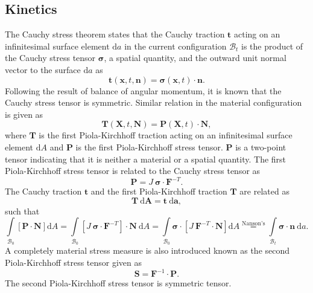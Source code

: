 \documentclass[11pt,a4paper,final]{article}
\begin{document}
\subsection{Kinetics}
The Cauchy stress theorem states that the Cauchy traction $\mathbf{t}$ acting on an infinitesimal surface element $\mathrm{d}a$ in the current configuration $\mathcal{B}_t$ is the product of the Cauchy stress tensor $\bm{\sigma}$, a spatial quantity, and the outward unit normal vector to the surface $\mathrm{d}a$ as 
\begin{equation}
\mathbf{t}(\mathbf{x}, t, \mathbf{n}) = \bm{\sigma}(\mathbf{x}, t) \cdot \mathbf{n}.
\end{equation}
Following the result of balance of angular momentum, it is known that the Cauchy stress tensor is symmetric. Similar relation in the material configuration is given as 
\begin{equation}
\mathbf{T}(\mathbf{X}, t, \mathbf{N}) = \mathbf{P}(\mathbf{X}, t) \cdot \mathbf{N},
\end{equation}
where $\mathbf{T}$ is the first Piola-Kirchhoff traction acting on an infinitesimal surface element $\mathrm{d}A$ and $\mathbf{P}$ is the first Piola-Kirchhoff stress tensor. $\mathbf{P}$ is a two-point tensor indicating that it is neither a material or a spatial quantity. The first Piola-Kirchhoff stress tensor is related to the Cauchy stress tensor as 
\begin{equation}
\mathbf{P} = J \ \bm{\sigma} \cdot \mathbf{F}^{-T}.
\end{equation}
The Cauchy traction $\mathbf{t}$ and the first Piola-Kirchhoff traction $\mathbf{T}$ are related as 
\begin{equation}
\mathbf{T} \ \bm{\mathrm{d}}\mathbf{A} = \mathbf{t} \ \bm{\mathrm{d}}\mathbf{a},
\end{equation}
such that
\begin{equation}
\int\limits_{\mathcal{B}_0} \left[ \mathbf{P} \cdot \mathbf{N} \right] \mathrm{d}A = \int\limits_{\mathcal{B}_0} \left[ J \ \bm{\sigma} \cdot \mathbf{F}^{-T} \right] \cdot \mathbf{N} \ \mathrm{d}A = \int\limits_{\mathcal{B}_0} \bm{\sigma} \cdot \left[ J \ \mathbf{F}^{-T} \cdot \mathbf{N} \right] \mathrm{d}A \stackrel{\text{Nanson's}}{=} \int\limits_{\mathcal{B}_t} \bm{\sigma} \cdot \mathbf{n} \ \mathrm{d}a.
\end{equation}
A completely material stress measure is also introduced known as the second Piola-Kirchhoff stress tensor given as
\begin{equation}
\mathbf{S} = \mathbf{F}^{-1} \cdot \mathbf{P}.
\end{equation}
The second Piola-Kirchhoff stress tensor is symmetric tensor.
\end{document}

